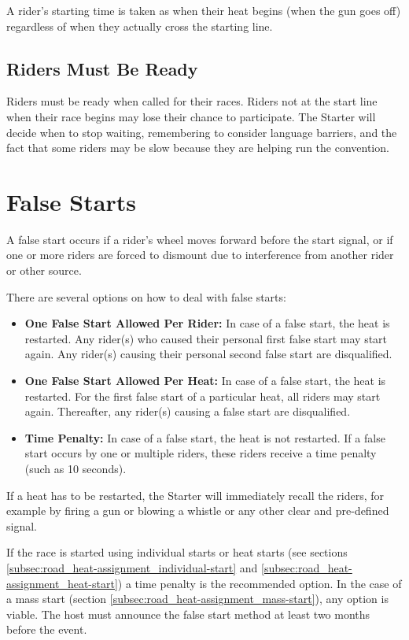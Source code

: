 A rider's starting time is taken as when their heat begins (when the gun goes off) regardless of when they actually cross the starting line.
\subsection{Riders Must Be Ready}
Riders must be ready when called for their races.
Riders not at the start line when their race begins may lose their chance to participate.
The Starter will decide when to stop waiting, remembering to consider language barriers, and the fact that some riders may be slow because they are helping run the convention.

\section{False Starts}
A false start occurs if a rider's wheel moves forward before the start signal, or if one or more riders are forced to dismount due to interference from another rider or other source.

There are several options on how to deal with false starts:
\begin{itemize}
\item \textbf{One False Start Allowed Per Rider:}
In case of a false start, the heat is restarted.
Any rider(s) who caused their personal first false start may start again.
Any rider(s) causing their personal second false start are disqualified.
\item \textbf{One False Start Allowed Per Heat:} 
In case of a false start, the heat is restarted.
For the first false start of a particular heat, all riders may start again.
Thereafter, any rider(s) causing a false start are disqualified.
\item \textbf{Time Penalty:}
In case of a false start, the heat is not restarted.
If a false start occurs by one or multiple riders, these riders receive a time penalty (such as 10 seconds).
\end{itemize}
If a heat has to be restarted, the Starter will immediately recall the riders, for example by firing a gun or blowing a whistle or any other clear and pre-defined signal.

If the race is started using individual starts or heat starts (see sections \ref{subsec:road_heat-assignment_individual-start} and \ref{subsec:road_heat-assignment_heat-start}) a time penalty is the recommended option.
In the case of a mass start (section \ref{subsec:road_heat-assignment_mass-start}), any option is viable.
The host must announce the false start method at least two months before the event.

